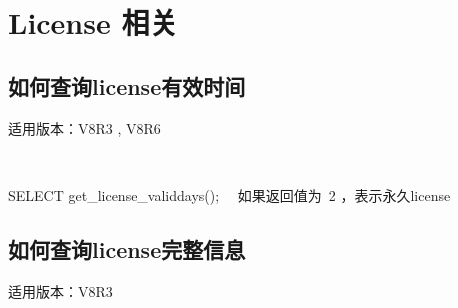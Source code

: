\documentclass[a4,10pt,oneside,english]{sphinxmanual}
\begin{document}
\chapter{License 相关}
\label{\detokenize{license:license}}\label{\detokenize{license::doc}}

\section{如何查询license有效时间}
\label{\detokenize{license:id1}}
适用版本：V8R3 , V8R6

\begin{sphinxVerbatim}[commandchars=\\\{\}]
 
\end{sphinxVerbatim}

SELECT get\_license\_validdays();   如果返回值为 \sphinxhyphen{}2 ，表示永久license


\section{如何查询license完整信息}
\label{\detokenize{license:id2}}
适用版本：V8R3
\end{document}
